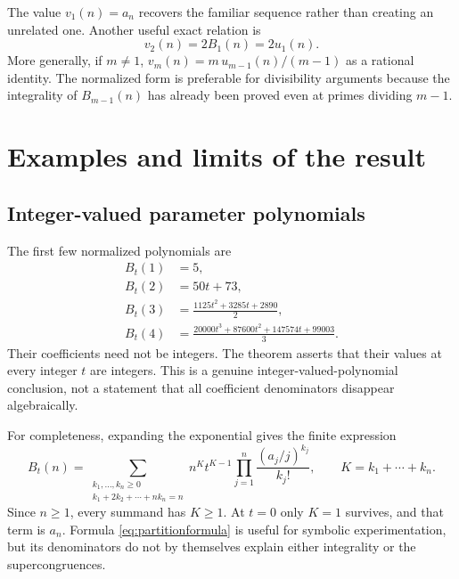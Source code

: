 \documentclass[11pt,letterpaper]{article}
\numberwithin{equation}{section}
\theoremstyle{definition}
\theoremstyle{remark}
\begin{document}
The value $v_1(n)=a_n$ recovers the familiar sequence rather than creating
an unrelated one. Another useful exact relation is
\begin{equation}\label{eq:v2}
 v_2(n)=2B_1(n)=2u_1(n).
\end{equation}
More generally, if $m\ne1$,
$v_m(n)=m\,u_{m-1}(n)/(m-1)$ as a rational identity. The normalized
form is preferable for divisibility arguments because the integrality of
$B_{m-1}(n)$ has already been proved even at primes dividing $m-1$.

\section{Examples and limits of the result}\label{sec:examples}
\subsection{Integer-valued parameter polynomials}
The first few normalized polynomials are
\begin{align*}
 B_t(1)&=5,\\
 B_t(2)&=50t+73,\\
 B_t(3)&=\frac{1125t^2+3285t+2890}{2},\\
 B_t(4)&=\frac{20000t^3+87600t^2+147574t+99003}{3}.
\end{align*}
Their coefficients need not be integers. The theorem asserts that their
values at every integer $t$ are integers. This is a genuine
integer-valued-polynomial conclusion, not a statement that all coefficient
denominators disappear algebraically.

For completeness, expanding the exponential gives the finite expression
\begin{equation}\label{eq:partitionformula}
 B_t(n)=\sum_{\substack{k_1,\ldots,k_n\ge0\\
                        k_1+2k_2+\cdots+nk_n=n}}
 n^K t^{K-1}\prod_{j=1}^n\frac{(a_j/j)^{k_j}}{k_j!},
 \qquad K=k_1+\cdots+k_n.
\end{equation}
Since $n\ge1$, every summand has $K\ge1$. At $t=0$ only $K=1$ survives,
and that term is $a_n$. Formula \eqref{eq:partitionformula} is useful
for symbolic experimentation, but its denominators do not by themselves
explain either integrality or the supercongruences.
\end{document}
